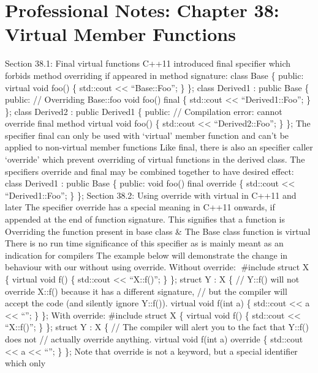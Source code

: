 \hypertarget{professional-notes-chapter-38-virtual-member-functions-1}{%
\chapter{Professional Notes: Chapter 38: Virtual Member
Functions}\label{professional-notes-chapter-38-virtual-member-functions-1}}

Section 38.1: Final virtual functions C++11 introduced final speciﬁer
which forbids method overriding if appeared in method signature: class
Base \{ public: virtual void foo() \{ std::cout \textless\textless{}
``Base::Foo\n''; \} \}; class Derived1 : public Base \{ public: //
Overriding Base::foo void foo() final \{ std::cout \textless\textless{}
``Derived1::Foo\n''; \} \}; class Derived2 : public Derived1 \{ public:
// Compilation error: cannot override final method virtual void foo() \{
std::cout \textless\textless{} ``Derived2::Foo\n''; \} \}; The speciﬁer
final can only be used with `virtual' member function and can't be
applied to non-virtual member functions Like final, there is also an
speciﬁer caller `override' which prevent overriding of virtual functions
in the derived class. The speciﬁers override and final may be combined
together to have desired eﬀect: class Derived1 : public Base \{ public:
void foo() final override \{ std::cout \textless\textless{}
``Derived1::Foo\n''; \} \}; Section 38.2: Using override with virtual in
C++11 and later The speciﬁer override has a special meaning in C++11
onwards, if appended at the end of function signature. This signiﬁes
that a function is Overriding the function present in base class \& The
Base class function is virtual There is no run time signiﬁcance of this
speciﬁer as is mainly meant as an indication for compilers The example
below will demonstrate the change in behaviour with our without using
override. Without override: \#include struct X \{ virtual void f() \{
std::cout \textless\textless{} ``X::f()\n''; \} \}; struct Y : X \{ //
Y::f() will not override X::f() because it has a different signature, //
but the compiler will accept the code (and silently ignore Y::f()).
virtual void f(int a) \{ std::cout \textless\textless{} a
\textless\textless{} ``\n''; \} \}; With override: \#include struct X \{
virtual void f() \{ std::cout \textless\textless{} ``X::f()\n''; \} \};
struct Y : X \{ // The compiler will alert you to the fact that Y::f()
does not // actually override anything. virtual void f(int a) override
\{ std::cout \textless\textless{} a \textless\textless{} ``\n''; \} \};
Note that override is not a keyword, but a special identiﬁer which only
